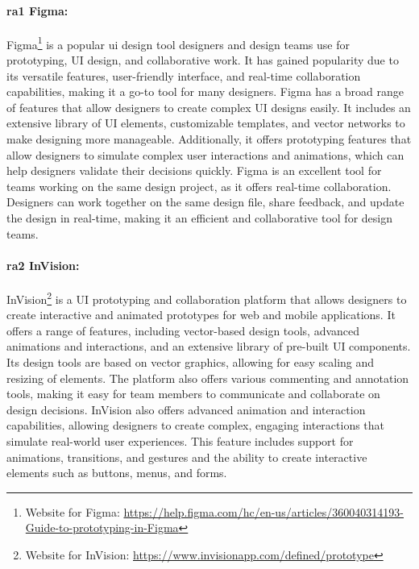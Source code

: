 \paragraph{\ac{ra}1 Figma:} 
Figma\footnote{Website for Figma: \url{https://help.figma.com/hc/en-us/articles/360040314193-Guide-to-prototyping-in-Figma}} is a popular \ac{ui} design tool designers and design teams use for prototyping, UI design, and collaborative work. 
It has gained popularity due to its versatile features, user-friendly interface, and real-time collaboration capabilities, making it a go-to tool for many designers.
Figma has a broad range of features that allow designers to create complex UI designs easily. 
It includes an extensive library of UI elements, customizable templates, and vector networks to make designing more manageable. 
Additionally, it offers prototyping features that allow designers to simulate complex user interactions and animations, which can help designers validate their decisions quickly. 
Figma is an excellent tool for teams working on the same design project, as it offers real-time collaboration. 
Designers can work together on the same design file, share feedback, and update the design in real-time, making it an efficient and collaborative tool for design teams.

\paragraph{\ac{ra}2 InVision:}
InVision\footnote{Website for InVision: \url{https://www.invisionapp.com/defined/prototype}} is a UI prototyping and collaboration platform that allows designers to create interactive and animated prototypes for web and mobile applications. 
It offers a range of features, including vector-based design tools, advanced animations and interactions, and an extensive library of pre-built UI components.
Its design tools are based on vector graphics, allowing for easy scaling and resizing of elements.
The platform also offers various commenting and annotation tools, making it easy for team members to communicate and collaborate on design decisions.
InVision also offers advanced animation and interaction capabilities, allowing designers to create complex, engaging interactions that simulate real-world user experiences. This feature includes support for animations, transitions, and gestures and the ability to create interactive elements such as buttons, menus, and forms.

